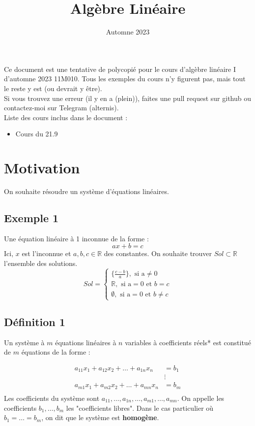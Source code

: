 \documentclass[12pt]{article}
\title{Algèbre Linéaire}
\date{Automne 2023}
\begin{document}
\maketitle

\newcommand{\R}{\mathbb{R}}
\newcommand{\K}{\mathrm{K}}
\newcommand{\C}{\mathbb{C}}
\newcommand{\zero}{\mathbb{0}}
\newcommand{\family}{\{v_i\}_{i\in I}}
\newcommand{\uv}{\{u,v\}}

Ce document est une tentative de polycopié pour le cours d'algèbre 
linéaire I d'automne 2023 11M010. Tous les exemples du cours n'y figurent pas, mais tout le reste y est (ou devrait y être).
\\
Si vous trouvez une erreur (il y en a (plein)), faites une pull request sur github ou contactez-moi sur Telegram (alternis).
\\
Liste des cours inclus dans le document :
\begin{itemize}
    \item Cours du 21.9
\end{itemize}
\pagebreak
\tableofcontents
\pagebreak

\section*{Motivation}
On souhaite résoudre un système d'équations linéaires.
\subsection*{Exemple 1}
Une équation linéaire à 1 inconnue de la forme :
$$
ax+b=c
$$
Ici, $x$ est l'inconnue et $a,b,c \in \R$ des constantes. On souhaite trouver $Sol \subset \R$
l'ensemble des solutions.
$$
Sol = \begin{cases} \{\frac{c-b}{a}\}, \text{ si a} \neq 0 \\
     \R, \text{ si a}=0 \text{ et } b = c \\ 
    \emptyset, \text{ si a}=0 \text{ et } b \neq c
    \end{cases}
$$
\subsection*{Définition 1}
Un système à $m$ équations linéaires à $n$ variables à 
coefficients réels* est constitué de $m$ équations de la forme :

$$
\begin{aligned}
    a_{11}x_1 + a_{12}x_2 + \dots + a_{1n}x_n &=b_1 \\
    & \vdots \\
    a_{m1}x_1 + a_{m2}x_2 + \dots + a_{mn}x_n &=b_m \\
\end{aligned}
$$
Les coefficients du système sont $a_{11}, \dots, a_{1n}, \dots, a_{m1}, \dots, a_{mn}$.
On appelle les coefficients $b_1, \dots, b_m$ les "coefficients libres".
Dans le cas particulier où $b_1 = \dots = b_m$, on dit que le système est \textbf{homogène}.
\end{document}
